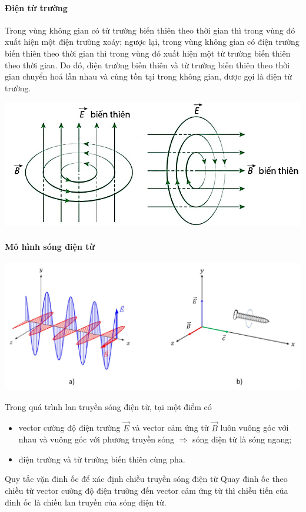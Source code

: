 \begin{tomtat}
	\paragraph{Điện từ trường}
	\begin{dn}
		Trong vùng không gian có từ trường biến thiên theo thời gian thì trong vùng đó xuất hiện một điện trường xoáy; ngược lại, trong vùng không gian có điện trường biến thiên theo thời gian thì trong vùng đó xuất hiện một từ trường biến thiên theo thời gian. Do đó, điện trường biến thiên và từ trường biến thiên theo thời gian chuyển hoá lẫn nhau và cùng tồn tại trong không gian, được gọi là điện từ trường.
	\end{dn}
	\begin{center}
		\includegraphics[width=0.6\linewidth]{figs/VN12-Y24-PH-SYL-021-3}
	\end{center}
	\paragraph{Mô hình sóng điện từ}
	\begin{center}
		\includegraphics[width=0.8\linewidth]{figs/VN12-Y24-PH-SYL-021-4}
	\end{center}
	Trong quá trình lan truyền sóng điện từ, tại một điểm có
	\begin{itemize}
		\item vector cường độ điện trường $\vec{E}$ và vector cảm ứng từ $\vec{B}$ luôn vuông góc với nhau và vuông góc với phương truyền sóng $\Rightarrow $ sóng điện từ là sóng ngang;
		\item điện trường và từ trường biến thiên cùng pha.
	\end{itemize}
\begin{noidung}{Quy tắc vặn đinh ốc để xác định chiều truyền sóng điện từ}
	Quay đinh ốc theo chiều từ vector cường độ điện trường đến vector cảm ứng từ thì chiều tiến của đinh ốc là chiều lan truyền của sóng điện từ.
\end{noidung}
\end{tomtat}

